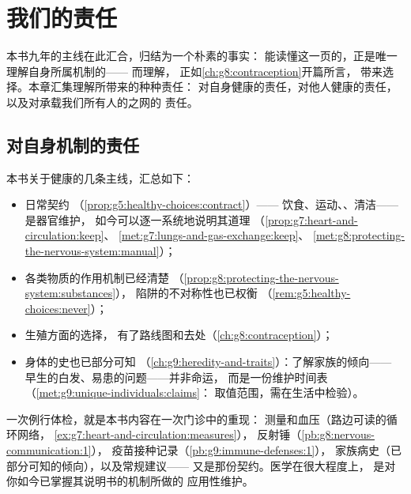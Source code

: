 \chapter{我们的责任}\label{ch:g9:our-responsibility}

本书九年的主线在此汇合，归结为一个朴素的事实：
能读懂这一页的，正是唯一理解自身所属机制的——
而理解，
正如\cref{ch:g8:contraception}开篇所言，
带来选择。本章汇集理解所带来的种种责任：
对自身健康的责任，对他人健康的责任，
以及对承载我们所有人的之网的
责任。

\section{对自身机制的责任}

\begin{proposition}[作为知情自我管理的健康]\label{prop:g9:our-responsibility:self}
本书关于健康的几条主线，汇总如下：
\begin{itemize}
  \item 日常契约
        （\cref{prop:g5:healthy-choices:contract}）——
        饮食、运动、、清洁——是器官维护，
        如今可以逐一系统地说明其道理
        （\cref{prop:g7:heart-and-circulation:keep}、
        \cref{met:g7:lungs-and-gas-exchange:keep}、
        \cref{met:g8:protecting-the-nervous-system:manual}）；
  \item 各类物质的作用机制已经清楚
        （\cref{prop:g8:protecting-the-nervous-system:substances}），
        陷阱的不对称性也已权衡
        （\cref{rem:g5:healthy-choices:never}）；
  \item 生殖方面的选择，
        有了路线图和去处（\cref{ch:g8:contraception}）；
  \item 身体的史也已部分可知
        （\cref{ch:g9:heredity-and-traits}）：了解家族的倾向——
        早生的白发、易患的问题——并非命运，
        而是一份维护时间表
        （\cref{met:g9:unique-individuals:claims}：
        取值范围，需在生活中检验）。
\end{itemize}
\end{proposition}
\admitted

\begin{example}[从生物学看体检]\label{ex:g9:our-responsibility:checkup}
一次例行体检，就是本书内容在一次门诊中的重现：
测量和血压（路边可读的循环网络，
\cref{ex:g7:heart-and-circulation:measures}），
反射锤（\cref{pb:g8:nervous-communication:1}），
疫苗接种记录（\cref{pb:g9:immune-defenses:1}），
家族病史（已部分可知的倾向），以及常规建议——
又是那份契约。医学在很大程度上，
是对你如今已掌握其说明书的机制所做的
应用性维护。
\end{example}

